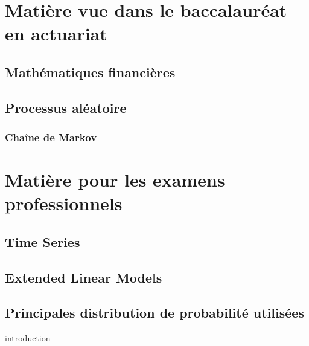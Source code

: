 \documentclass[12pt, french]{report}
\begin{document}
\part{Matière vue dans le baccalauréat en actuariat}




\chapter{Mathématiques financières}


\chapter{Processus aléatoire}

\section{Chaîne de Markov}
\label{sec:chaine-markov}



\part{Matière pour les examens professionnels}

\chapter{Time Series}

\label{sec:Serie-Chronologique}

\chapter{Extended Linear Models}

\label{sec:Extended-Linear-Models}

\appendix
\chapter{Principales distribution de probabilité utilisées}
introduction



\end{document}

